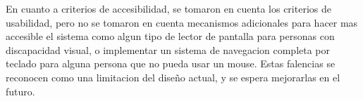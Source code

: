 En cuanto a criterios de accesibilidad, se tomaron en cuenta los criterios de usabilidad, pero no se tomaron en cuenta mecanismos adicionales para hacer mas accesible el sistema como algun tipo de lector de pantalla para personas con discapacidad visual, o implementar un sistema de navegacion completa por teclado para alguna persona que no pueda usar un mouse. Estas falencias se reconocen como una limitacion del diseño actual, y se espera mejorarlas en el futuro. 

